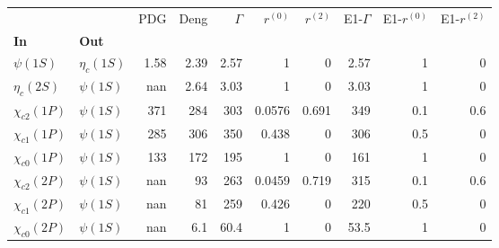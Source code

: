 \begin{tabular}{l|l|r|r|r|r|r|r|r|r}
\toprule
                &            &  PDG &  Deng &  $\Gamma$ &  $r^{(0)}$ &  $r^{(2)}$ &  E1-$\Gamma$ &  E1-$r^{(0)}$ &  E1-$r^{(2)}$ \\
\textbf{In} & \textbf{Out} &      &       &           &            &            &              &               &               \\
\midrule
\textbf{$\psi(1S)$} & \textbf{$\eta_{c}(1S)$} & 1.58 &  2.39 &      2.57 &          1 &          0 &         2.57 &             1 &             0 \\
\textbf{$\eta_{c}(2S)$} & \textbf{$\psi(1S)$} &  nan &  2.64 &      3.03 &          1 &          0 &         3.03 &             1 &             0 \\
\textbf{$\chi_{c2}(1P)$} & \textbf{$\psi(1S)$} &  371 &   284 &       303 &     0.0576 &      0.691 &          349 &           0.1 &           0.6 \\
\textbf{$\chi_{c1}(1P)$} & \textbf{$\psi(1S)$} &  285 &   306 &       350 &      0.438 &          0 &          306 &           0.5 &             0 \\
\textbf{$\chi_{c0}(1P)$} & \textbf{$\psi(1S)$} &  133 &   172 &       195 &          1 &          0 &          161 &             1 &             0 \\
\textbf{$\chi_{c2}(2P)$} & \textbf{$\psi(1S)$} &  nan &    93 &       263 &     0.0459 &      0.719 &          315 &           0.1 &           0.6 \\
\textbf{$\chi_{c1}(2P)$} & \textbf{$\psi(1S)$} &  nan &    81 &       259 &      0.426 &          0 &          220 &           0.5 &             0 \\
\textbf{$\chi_{c0}(2P)$} & \textbf{$\psi(1S)$} &  nan &   6.1 &      60.4 &          1 &          0 &         53.5 &             1 &             0 \\
\bottomrule
\end{tabular}
